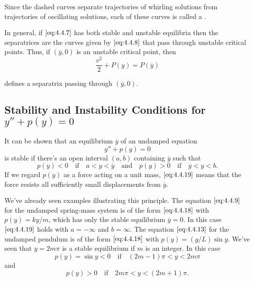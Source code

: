 \documentclass{ximera}
\begin{document}
\begin{example}
Since the dashed curves separate trajectories of whirling solutions
from trajectories of oscillating solutions, each of these curves is
called a .
 
In general, if $\eqref{eq:4.4.7}$ has both stable and unstable equilibria
then the separatrices are the curves given by $\eqref{eq:4.4.8}$ that pass
through unstable critical points. Thus, if $(\overline{y},0)$ is an
unstable critical point, then
\begin{equation}\label{eq:4.4.17}
\frac{v^2}{2}+P(y)=P(\overline{y})
\end{equation}
 
defines a separatrix passing through $(\overline{y},0)$.
\end{example}
 
\subsection*{Stability  and Instability Conditions for $y''+p(y)=0$}
 
It can be shown %
that an equilibrium
$\overline{y}$ of an undamped equation
\begin{equation}\label{eq:4.4.18}
y''+p(y)=0
\end{equation}
is stable if there's an open interval $(a,b)$ containing $\overline
y$ such that
\begin{equation}\label{eq:4.4.19}
p(y)<0 \quad\mbox{if}\quad a<y<\overline{y}\quad\mbox{and}\quad p(y)>0 \quad\mbox{if}\quad
\overline{y}<y<b.
\end{equation}
If we regard $p(y)$ as a force acting on a unit mass,
$\eqref{eq:4.4.19}$ means that the force resists all sufficiently small
displacements from $\overline{y}$.
 
 
We've already seen examples illustrating this principle. The equation
$\eqref{eq:4.4.9}$ for the undamped spring-mass system is of the form
$\eqref{eq:4.4.18}$ with $p(y)=ky/m$, which has only the stable equilibrium
$\overline{y}=0$. In this case $\eqref{eq:4.4.19}$ holds with $a=-\infty$ and
$b=\infty$. The equation $\eqref{eq:4.4.13}$ for the undamped pendulum is of
the form $\eqref{eq:4.4.18}$ with $p(y)=(g/L)\sin y$. We've seen that
$\overline{y}=2m\pi$ is a stable equilibrium if $m$ is an integer. In
this case
$$
p(y)=\sin y<0
\quad\mbox{if}\quad(2m-1)\pi<y<2m\pi
$$
and
$$
p(y)>0 \quad\mbox{if}\quad 2m\pi<y<(2m+1)\pi.
$$
 
\end{document}
